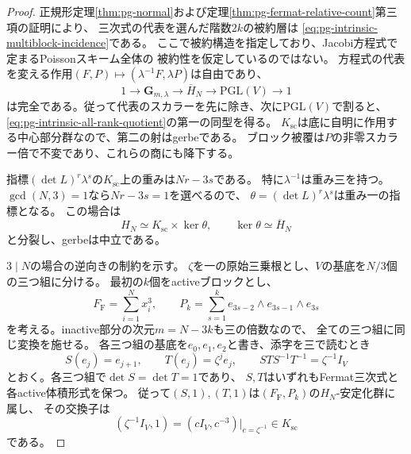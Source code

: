 \begin{proof}
正規形定理\ref{thm:pg-normal}および定理\ref{thm:pg-fermat-relative-count}第三項の証明により、
三次式の代表を選んだ階数$2k$の被約層は
\eqref{eq:pg-intrinsic-multiblock-incidence}である。
ここで被約構造を指定しており、Jacobi方程式で定まるPoissonスキーム全体の
被約性を仮定しているのではない。
方程式の代表を変える作用$(F,P)\mapsto(\lambda^{-1}F,\lambda P)$は自由であり、
\begin{equation}
 1\longrightarrow\mathbf G_{m,\lambda}
 \longrightarrow\overline H_N
 \longrightarrow\mathrm{PGL}(V)\longrightarrow1
 \label{eq:pg-intrinsic-all-rank-effective-group}
\end{equation}
は完全である。従って代表のスカラーを先に除き、次に$\mathrm{PGL}(V)$で割ると、
\eqref{eq:pg-intrinsic-all-rank-quotient}の第一の同型を得る。
$K_{\mathrm{sc}}$は底に自明に作用する中心部分群なので、第二の射はgerbeである。
ブロック被覆は$P$の非零スカラー倍で不変であり、これらの商にも降下する。

指標$(\det L)^r\lambda^s$の$K_{\mathrm{sc}}$上の重みは$Nr-3s$である。
特に$\lambda^{-1}$は重み三を持つ。
$\gcd(N,3)=1$なら$Nr-3s=1$を選べるので、
$\theta=(\det L)^r\lambda^s$は重み一の指標となる。
この場合は
\begin{equation}
 H_N\simeq K_{\mathrm{sc}}\times\ker\theta,
 \qquad\ker\theta\simeq\overline H_N
 \label{eq:pg-intrinsic-all-rank-neutralization}
\end{equation}
と分裂し、gerbeは中立である。

$3\mid N$の場合の逆向きの制約を示す。
$\zeta$を一の原始三乗根とし、$V$の基底を$N/3$個の三つ組に分ける。
最初の$k$個をactiveブロックとし、
\begin{equation}
 F_{\mathrm F}=\sum_{i=1}^N x_i^3,\qquad
 P_k=\sum_{s=1}^k
 e_{3s-2}\wedge e_{3s-1}\wedge e_{3s}
 \label{eq:pg-intrinsic-period-fermat-point}
\end{equation}
を考える。inactive部分の次元$m=N-3k$も三の倍数なので、
全ての三つ組に同じ変換を施せる。
各三つ組の基底を$e_0,e_1,e_2$と書き、添字を三で読むとき
\begin{equation}
 S(e_j)=e_{j+1},\qquad T(e_j)=\zeta^j e_j,
 \qquad STS^{-1}T^{-1}=\zeta^{-1}I_V
 \label{eq:pg-intrinsic-period-heisenberg-commutator}
\end{equation}
とおく。各三つ組で$\det S=\det T=1$であり、
$S,T$はいずれもFermat三次式と各active体積形式を保つ。
従って$(S,1),(T,1)$は$(F_{\mathrm F},P_k)$の$H_N$-安定化群に属し、
その交換子は
\begin{equation}
 (\zeta^{-1}I_V,1)
   =(cI_V,c^{-3})\big|_{c=\zeta^{-1}}\in K_{\mathrm{sc}}
 \label{eq:pg-intrinsic-period-scalar-commutator}
\end{equation}
である。


\end{proof}
